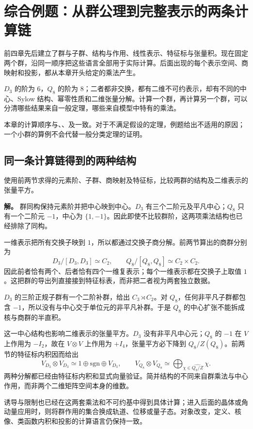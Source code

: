\chapter{综合例题：从群公理到完整表示的两条计算链}
\label{chap:group-comprehensive-d3-q8}

前四章先后建立了群与子群、结构与作用、线性表示、特征标与张量积。现在固定两个群，沿同一顺序把这些语言全部用于实际计算。后面出现的每个表示空间、商映射和投影，都从本章开头给定的乘法产生。

$D_3$ 的阶为 $6$，$Q_8$ 的阶为 $8$；二者都非交换，都有二维不可约表示，却有不同的中心、Sylow 结构、幂零性质和二维张量分解。计算一个群，再计算另一个群，可以分清哪些结果来自一般定理，哪些来自模型中特有的乘法。

本章的计算顺序与、、及一致。对于不满足假设的定理，例题给出不适用的原因；一个小群的算例不会代替一般分类定理的证明。




\section{同一条计算链得到的两种结构}
\label{sec:group-comprehensive-comparison}

\begin{exbox}
使用前两节求得的元素阶、子群、商映射及特征标，比较两群的结构及二维表示的张量平方。

\textbf{解。} 群同构保持元素阶并把中心映到中心。$D_3$ 有三个二阶元及平凡中心；$Q_8$ 只有一个二阶元 $-1$，中心为 $\{1,-1\}$。因此即使不比较群阶，这两项乘法结构也已经排除了同构。

一维表示把所有交换子映到 $1$，所以都通过交换子商分解。前两节算出的商群分别为
\[
D_3/[D_3,D_3]\simeq C_2,
\qquad
Q_8/[Q_8,Q_8]\simeq C_2\times C_2.
\]
因此前者恰有两个、后者恰有四个一维复表示；每个一维表示都在交换子上取值 $1$。这把群的导出列直接接到特征标表，而非把二者视为两套独立数据。

$D_3$ 的三阶正规子群有一个二阶补群，给出 $C_3\rtimes C_2$。对 $Q_8$，任何非平凡子群都包含 $-1$，所以没有与中心交于单位元的非平凡补群。于是 $Q_8$ 的中心扩张不能拆成核与商群的半直积。

这一中心结构也影响二维表示的张量平方。$D_3$ 没有非平凡中心元；$Q_8$ 的 $-1$ 在 $V$ 上作用为 $-I_2$，故在 $V\otimes V$ 上作用为 $+I_4$，张量平方必下降到 $Q_8/Z(Q_8)$。前两节的特征标内积因而给出
\[
V_{D_3}\otimes V_{D_3}\simeq 1\oplus\mathrm{sgn}\oplus V_{D_3},
\qquad
V_{Q_8}\otimes V_{Q_8}\simeq\bigoplus_{\chi\in\widehat{Q_8/Z}}\chi.
\]
两种分解都已经由特征标内积和显式向量验证。简并结构的不同来自群乘法与中心作用，而非两个二维矩阵空间本身的维数。
\end{exbox}

诱导与限制也已经在这两套乘法和不可约基中得到具体计算；进入后面的晶体或角动量应用时，则将群作用的集合换成轨道、位移或量子态。对象改变，定义、核像、类函数内积和投影的计算语言仍保持一致。
